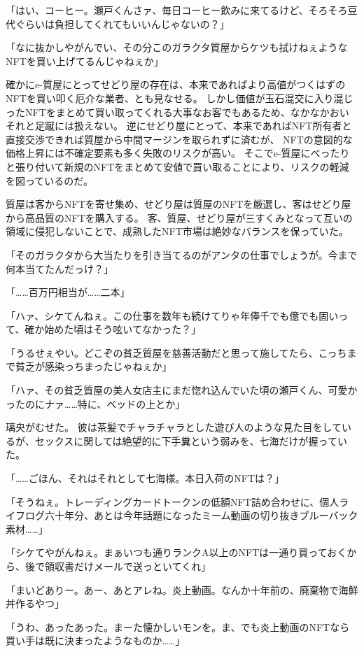 「はい、コーヒー。瀬戸くんさァ、毎日コーヒー飲みに来てるけど、そろそろ豆代ぐらいは負担してくれてもいいんじゃないの？」

「なに抜かしやがんでい、その分このガラクタ質屋からケツも拭けねぇようなNFTを買い上げてるんじゃねぇか」

確かにe-質屋にとってせどり屋の存在は、本来であればより高値がつくはずのNFTを買い叩く厄介な業者、とも見なせる。
しかし価値が玉石混交に入り混じったNFTをまとめて買い取ってくれる大事なお客でもあるため、なかなかおいそれと足蹴には扱えない。
逆にせどり屋にとって、本来であればNFT所有者と直接交渉できれば質屋から中間マージンを取られずに済むが、
NFTの意図的な価格上昇には不確定要素も多く失敗のリスクが高い。
そこでe-質屋にべったりと張り付いて新規のNFTをまとめて安値で買い取ることにより、リスクの軽減を図っているのだ。

質屋は客からNFTを寄せ集め、せどり屋は質屋のNFTを厳選し、客はせどり屋から高品質のNFTを購入する。
客、質屋、せどり屋が三すくみとなって互いの領域に侵犯しないことで、成熟したNFT市場は絶妙なバランスを保っていた。

「そのガラクタから大当たりを引き当てるのがアンタの仕事でしょうが。今まで何本当てたんだっけ？」

「……百万円相当が……二本」

「ハァ、シケてんねぇ。この仕事を数年も続けてりゃ年俸千でも億でも固いって、確か始めた頃はそう呟いてなかった？」

「うるせぇやい。どこぞの貧乏質屋を慈善活動だと思って施してたら、こっちまで貧乏が感染っちまったじゃねぇか」

「ハァ、その貧乏質屋の美人女店主にまだ惚れ込んでいた頃の瀬戸くん、可愛かったのにナァ……特に、ベッドの上とか」

璃央がむせた。
彼は茶髪でチャラチャラとした遊び人のような見た目をしているが、セックスに関しては絶望的に下手糞という弱みを、七海だけが握っていた。

「……ごほん、それはそれとして七海様。本日入荷のNFTは？」

「そうねぇ。トレーディングカードトークンの低額NFT詰め合わせに、個人ライフログ六十年分、あとは今年話題になったミーム動画の切り抜きブルーバック素材……」

「シケてやがんねぇ。まぁいつも通りランクA以上のNFTは一通り買っておくから、後で領収書だけメールで送っといてくれ」

「まいどありー。あー、あとアレね。炎上動画。なんか十年前の、廃棄物で海鮮丼作るやつ」

「うわ、あったあった。まーた懐かしいモンを。ま、でも炎上動画のNFTなら買い手は既に決まったようなものか……」

